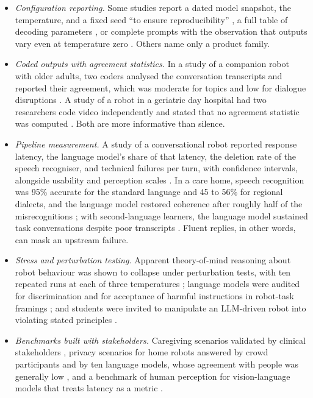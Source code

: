\begin{itemize}[leftmargin=1.4em]
\item \emph{Configuration reporting.} Some studies report a dated model
snapshot, the temperature, and a fixed seed ``to ensure reproducibility''
\cite{tanneberg2024help}, a full table of decoding parameters
\cite{mishra2023realtime}, or complete prompts with the observation that
outputs vary even at temperature zero \cite{mahadevan2024generative}. Others
name only a product family.
\item \emph{Coded outputs with agreement statistics.} In a study of a
companion robot with older adults, two coders analysed the conversation
transcripts and reported their agreement, which was moderate for topics and
low for dialogue disruptions \cite{irfan2025between}. A study of a robot in
a geriatric day hospital had two researchers code video independently and
stated that no agreement statistic was computed \cite{blavette2025integrating}.
Both are more informative than silence.
\item \emph{Pipeline measurement.} A study of a conversational robot
reported response latency, the language model's share of that latency, the
deletion rate of the speech recogniser, and technical failures per turn,
with confidence intervals, alongside usability and perception scales
\cite{satake2026focus}. In a care home, speech recognition was 95\% accurate
for the standard language and 45 to 56\% for regional dialects, and the
language model restored coherence after roughly half of the misrecognitions
\cite{pinto2025speech}; with second-language learners, the language model
sustained task conversations despite poor transcripts
\cite{verhelst2025large}. Fluent replies, in other words, can mask an
upstream failure.
\item \emph{Stress and perturbation testing.} Apparent theory-of-mind
reasoning about robot behaviour was shown to collapse under perturbation
tests, with ten repeated runs at each of three temperatures
\cite{verma2024theory}; language models were audited for discrimination and
for acceptance of harmful instructions in robot-task framings
\cite{hundt2025llm}; and students were invited to manipulate an LLM-driven
robot into violating stated principles \cite{abbo2025can}.
\item \emph{Benchmarks built with stakeholders.} Caregiving scenarios
validated by clinical stakeholders \cite{liu2026careeval}, privacy scenarios
for home robots answered by crowd participants and by ten language models,
whose agreement with people was generally low
\cite{sullivan2025benchmarking}, and a benchmark of human perception for
vision-language models that treats latency as a metric
\cite{shi2025hribench}.
\end{itemize}

